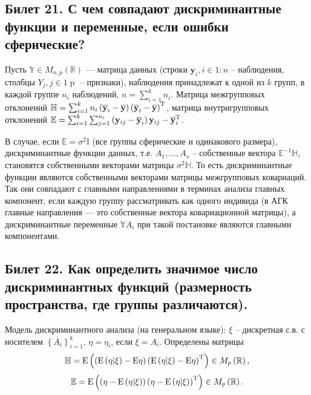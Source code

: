 
%   
% 


\subsection{Билет 21. С чем совпадают дискриминантные функции и переменные, если ошибки сферические?}

Пусть $\mathbb Y \in M_{n, p}\left(\mathbb R\right)$ --- матрица данных (строки $\mathbf y_i, i \in 1\mathbin : n$ -- наблюдения, столбцы $Y_j, j\in 1\mathbin p$ -- признаки), 
наблюдения принадлежат к одной из $k$ групп, 
в каждой группе $n_i$ наблюдений, $n = \sum_{i=1}^k n_i$. %
Матрица межгрупповых отклонений $\mathbb H = \sum_{i=1}^k n_i\left(\overline{\mathbf y}_i - \overline{\mathbf y}\right)\left(\overline{\mathbf y}_i - \overline{\mathbf y}\right)^{\mathrm{T}}$, 
матрица внутригрупповых отклонений $\mathbb E = \sum_{i=1}^k\sum_{j=1}^{n_i} \left(\mathbf y_{ij} - \overline{\mathbf y}_i\right)\mathbf y_{ij} - \overline{\mathbf y}_i^{\mathrm{T}}$.

В случае, если $\mathbb E = \sigma^2\mathbb I$ (все группы сферические и одинакового размера), дискриминантные функции данных, т.е. $A_1, \ldots, A_s$ -- собственные вектора $\mathbb E^{-1}\mathbb H$, становятся собственными векторами матрицы $\sigma^2\mathbb H$. То есть дискриминантные функции являются собственными векторами матрицы межгрупповых ковариаций. Так они совпадают с главными направлениями в терминах анализа главных компонент, если каждую группу рассматривать как одного индивида (в АГК главные направления --- это собственные вектора ковариационной матрицы), а дискриминантные переменные $\mathbb Y A_i$ при такой постановке являются главными компонентами.

\subsection{Билет 22. Как определить значимое число дискриминантных функций (размерность пространства, где группы различаются).}

Модель дискриминантного анализа (на генеральном языке): $\xi$ -- дискретная с.в. с носителем $\left\lbrace A_i\right\rbrace_{i=1}^k$, $\eta = \eta_i$, если $\xi = A_i$. Определены матрицы
$$\mathbb H = \mathrm E\left(\left(\mathrm E\left(\eta\middle\vert\xi\right) - \mathrm E\eta\right)\left(\mathrm E\left(\eta\middle\vert\xi\right) - \mathrm E\eta\right)^{\mathrm{T}}\right) \in M_p\left(\mathbb{R}\right),$$
$$\mathbb E = \mathrm E\left(\left(\eta - \mathrm E\left(\eta\middle\vert\xi\right)\right)\left(\eta - \mathrm E\left(\eta\middle\vert\xi\right)\right)^{\mathrm{T}}\right) \in M_p\left(\mathbb{R}\right).$$

